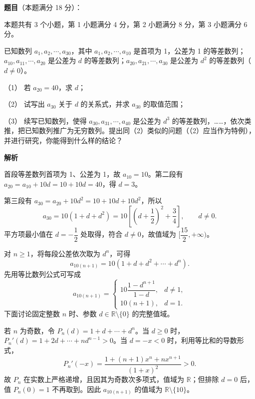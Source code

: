 \begin{answer}

\textbf{题目}（本题满分 18 分）：

本题共有 3 个小题，第 1 小题满分 4 分，第 2 小题满分 8 分，第 3 小题满分 6 分。

已知数列 $a_1,a_2,\cdots,a_{30}$，其中 $a_1,a_2,\cdots,a_{10}$ 是首项为 1，公差为 1 的等差数列；$a_{10},a_{11},\cdots,a_{20}$ 是公差为 $d$ 的等差数列；$a_{20},a_{21},\cdots,a_{30}$ 是公差为 $d^2$ 的等差数列（$d\neq0$）。

（1） 若 $a_{20}=40$，求 $d$；

（2） 试写出 $a_{30}$ 关于 $d$ 的关系式，并求 $a_{30}$ 的取值范围；

（3） 续写已知数列，使得 $a_{30},a_{31},\cdots,a_{40}$ 是公差为 $d^3$ 的等差数列，……，依次类推，把已知数列推广为无穷数列。提出同（2）类似的问题（（2）应当作为特例），并进行研究，你能得到什么样的结论？

\textbf{解析}


首段等差数列首项为 1、公差为 1，故 $a_{10}=10$。第二段有 $a_{20}=a_{10}+10d=10+10d=40$，得 $d=3$。


第三段有 $a_{30}=a_{20}+10d^2=10+10d+10d^2$，所以
\nopagebreak[4]
\[
a_{30}=10(1+d+d^2)=10\left[\left(d+\frac12\right)^2+\frac34\right],\qquad d\neq0.
\]
平方项最小值在 $d=-\dfrac12$ 处取得，符合 $d\neq0$，故值域为 $[\dfrac{15}{2},+\infty)$。


对 $n\geq1$，将每段公差依次取为 $d^n$，可得
\nopagebreak[4]
\[
a_{10(n+1)}=10(1+d+d^2+\cdots+d^n).
\]
先用等比数列公式可写成
\nopagebreak[4]
\[
a_{10(n+1)}=
\begin{cases}
10\dfrac{1-d^{n+1}}{1-d},&d\neq1,\\
10(n+1),&d=1.
\end{cases}
\]
下面讨论固定整数 $n$ 时、参数 $d\in\mathbb R\setminus\{0\}$ 的完整值域。

若 $n$ 为奇数，令 $P_n(d)=1+d+\cdots+d^n$。当 $d\geq0$ 时，$P_n'(d)=1+2d+\cdots+nd^{n-1}>0$。当 $d=-x<0$ 时，利用等比和的导数形式，
\nopagebreak[4]
\[
P_n'(-x)=\frac{1+(n+1)x^n+nx^{n+1}}{(1+x)^2}>0.
\]
故 $P_n$ 在实数上严格递增，且因其为奇数次多项式，值域为 $\mathbb R$；但排除 $d=0$ 后，值 $P_n(0)=1$ 不再取到。因此 $a_{10(n+1)}$ 的值域为 $\mathbb R\setminus\{10\}$。


\end{answer}
